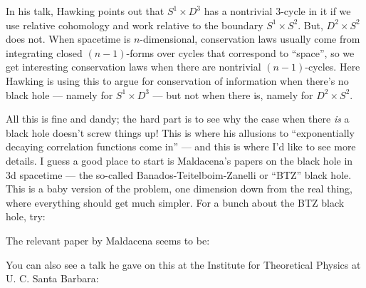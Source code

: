\documentclass{article}
\def\tightlist{}
\renewcommand{\texttt}[1]{%
  \begingroup
  \ttfamily
  \begingroup\lccode`~=`/\lowercase{\endgroup\def~}{/\discretionary{}{}{}}%
  \begingroup\lccode`~=`[\lowercase{\endgroup\def~}{[\discretionary{}{}{}}%
  \begingroup\lccode`~=`.\lowercase{\endgroup\def~}{.\discretionary{}{}{}}%
  \catcode`/=\active\catcode`[=\active\catcode`.=\active
  \scantokens{#1\noexpand}%
  \endgroup
}
\begin{document}
In his talk, Hawking points out that \(S^1 \times D^3\) has a nontrivial
\(3\)-cycle in it if we use relative cohomology and work relative to the
boundary \(S^1 \times S^2\). But, \(D^2 \times S^2\) does not. When
spacetime is \(n\)-dimensional, conservation laws usually come from
integrating closed \((n-1)\)-forms over cycles that correspond to
``space'', so we get interesting conservation laws when there are
nontrivial \((n-1)\)-cycles. Here Hawking is using this to argue for
conservation of information when there's no black hole --- namely for
\(S^1 \times D^3\) --- but not when there is, namely for
\(D^2 \times S^2\).

All this is fine and dandy; the hard part is to see why the case when
there \emph{is} a black hole doesn't screw things up! This is where his
allusions to ``exponentially decaying correlation functions come in''
--- and this is where I'd like to see more details. I guess a good place
to start is Maldacena's papers on the black hole in 3d spacetime --- the
so-called Banados-Teitelboim-Zanelli or ``BTZ'' black hole. This is a
baby version of the problem, one dimension down from the real thing,
where everything should get much simpler. For a bunch about the BTZ
black hole, try:


The relevant paper by Maldacena seems to be:


You can also see a talk he gave on this at the Institute for Theoretical
Physics at U. C. Santa Barbara:

\end{document}
